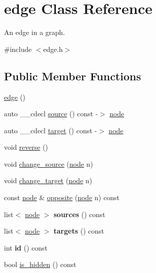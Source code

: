 \hypertarget{classedge}{}\section{edge Class Reference}
\label{classedge}


An edge in a graph.  




{\ttfamily \#include $<$edge.\+h$>$}

\subsection*{Public Member Functions}
\begin{DoxyCompactItemize}
\item 
\mbox{\hyperlink{classedge_a41859d2473a15e24255d7bc0de1f49b4}{edge}} ()
\item 
auto \+\_\+\+\_\+cdecl \mbox{\hyperlink{classedge_a32b9b7bfa7b337d6646decbc4fe90ac4}{source}} () const -\/$>$ \mbox{\hyperlink{classnode}{node}}
\item 
auto \+\_\+\+\_\+cdecl \mbox{\hyperlink{classedge_ae79f633c9409dd6f8ecf33a344b00fbd}{target}} () const -\/$>$ \mbox{\hyperlink{classnode}{node}}
\item 
void \mbox{\hyperlink{classedge_ad62516eb40dbee9f57a2078cfd97b4c9}{reverse}} ()
\item 
void \mbox{\hyperlink{classedge_ad9e615b1a11bbc88aae2b166d377f354}{change\+\_\+source}} (\mbox{\hyperlink{classnode}{node}} n)
\item 
void \mbox{\hyperlink{classedge_a2f797fda0f41412265d793982f2cf953}{change\+\_\+target}} (\mbox{\hyperlink{classnode}{node}} n)
\item 
const \mbox{\hyperlink{classnode}{node}} \& \mbox{\hyperlink{classedge_ab64dc3659c9003337b0c3749a8b879cf}{opposite}} (\mbox{\hyperlink{classnode}{node}} n) const
\item 
\mbox{\label{classedge_a01481a54b506f99dfad3ab64bc16715d}} 
list$<$ \mbox{\hyperlink{classnode}{node}} $>$ {\bfseries sources} () const
\item 
\mbox{\label{classedge_a2f0aa8c08e508f81734e360710237639}} 
list$<$ \mbox{\hyperlink{classnode}{node}} $>$ {\bfseries targets} () const
\item 
\mbox{\label{classedge_aa7635988ab396748d6081ae5d273923b}} 
int {\bfseries id} () const
\item 
bool \mbox{\hyperlink{classedge_ab6d6192a90b1cb77ce9dee2de78d9743}{is\+\_\+hidden}} () const
\end{DoxyCompactItemize}
